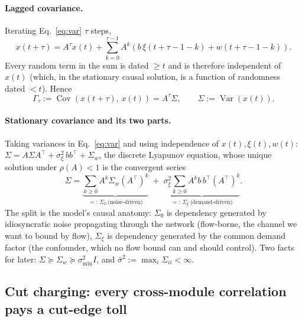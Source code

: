 \documentclass[11pt]{article}
\theoremstyle{definition}
\theoremstyle{remark}
\newcommand{\Var}{\operatorname{Var}}
\newcommand{\Cov}{\operatorname{Cov}}
\begin{document}
\paragraph{Lagged covariance.}
Iterating Eq.~\eqref{eq:var} $\tau$ steps,
\begin{equation}
    x(t + \tau)
    = A^\tau x(t)
    + \sum_{k=0}^{\tau - 1} A^{k}\!\left(b\, \xi(t + \tau - 1 - k)
    + w(t + \tau - 1 - k)\right).
    \label{eq:iterate}
\end{equation}
Every random term in the sum is dated $\geq t$ and is therefore independent
of $x(t)$ (which, in the stationary causal solution, is a function of
randomness dated $< t$).
Hence
\begin{equation}
    \Gamma_\tau := \Cov\!\left(x(t{+}\tau),\, x(t)\right) = A^\tau \Sigma,
    \qquad \Sigma := \Var\!\left(x(t)\right).
    \label{eq:gamma}
\end{equation}

\paragraph{Stationary covariance and its two parts.}
Taking variances in Eq.~\eqref{eq:var} and using independence of
$x(t), \xi(t), w(t)$:
$\Sigma = A \Sigma A^{\!\top} + \sigma_\xi^2\, b b^{\!\top} + \Sigma_w$,
the discrete Lyapunov equation, whose unique solution under
$\rho(A) < 1$ is the convergent series~\citep[Ch.~5]{horn2013matrix}
\begin{equation}
    \Sigma
    = \underbrace{\sum_{k \geq 0} A^{k} \Sigma_w (A^{\!\top})^{k}}_{=:\,
        \Sigma_0 \ \text{(noise-driven)}}
    \;+\;
    \underbrace{\sigma_\xi^2 \sum_{k \geq 0} A^{k} b\, b^{\!\top}
            (A^{\!\top})^{k}}_{=:\, \Sigma_\xi \ \text{(demand-driven)}}.
    \label{eq:lyap}
\end{equation}
The split is the model's causal anatomy: $\Sigma_0$ is dependency generated
by idiosyncratic noise propagating through the network (flow-borne, the
channel we want to bound by flow), $\Sigma_\xi$ is dependency generated by
the common demand factor (the confounder, which no flow bound can and should
control).
Two facts for later: $\Sigma \succeq \Sigma_w \succeq \sigma_{\min}^2 I$, and
$\bar{\sigma}^2 := \max_i \Sigma_{ii} < \infty$.

\subsection{Cut charging: every cross-module correlation pays a cut-edge toll}
\label{sec:cutcharge}
\end{document}
